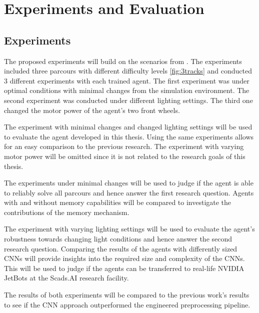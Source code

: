 \chapter{Experiments and Evaluation}
\label{cha:Experiments and Evaluation}

\section{Experiments}

The proposed experiments will build on the scenarios from \autocite{maximilian}. The experiments included three parcours with different difficulty levels \ref*{fig:3tracks} and conducted 3 different experiments with each trained agent. The first experiment was under optimal conditions with minimal changes from the simulation environment. The second experiment was conducted under different lighting settings. The third one changed the motor power of the agent's two front wheels.

The experiment with minimal changes and changed lighting settings will be used to evaluate the agent developed in this thesis. Using the same experiments allows for an easy comparison to the previous research. The experiment with varying motor power will be omitted since it is not related to the research goals of this thesis.

The experiments under minimal changes will be used to judge if the agent is able to reliably solve all parcours and hence answer the first research question. Agents with and without memory capabilities will be compared to investigate the contributions of the memory mechanism.

The experiment with varying lighting settings will be used to evaluate the agent's robustness towards changing light conditions and hence answer the second research question. Comparing the results of the agents with differently sized CNNs will provide insights into the required size and complexity of the CNNs. This will be used to judge if the agents can be transferred to real-life NVIDIA JetBots at the Scads.AI research facility.

The results of both experiments will be compared to the previous work's results to see if the CNN approach outperformed the engineered preprocessing pipeline.


